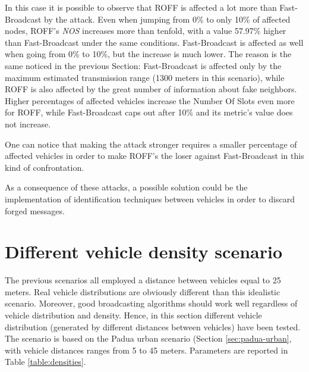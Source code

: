 			In this case it is possible to observe that ROFF is affected a lot more than Fast-Broadcast by the attack. Even when jumping from 0\% to only 10\% of affected nodes, ROFF's \textit{NOS} increases more than tenfold, with a value 57.97\% higher than Fast-Broadcast under the same conditions. Fast-Broadcast is affected as well when going from 0\% to 10\%, but the increase is much lower. The reason is the same noticed in the previous Section: Fast-Broadcast is affected only by the maximum estimated transmission range (1300 meters in this scenario), while ROFF is also affected by the great number of information about fake neighbors. Higher percentages of affected vehicles increase the Number Of Slots even more for ROFF, while Fast-Broadcast caps out after 10\% and its metric's value does not increase.
			
			
			One can notice that making the attack stronger requires a smaller percentage of affected vehicles in order to make ROFF's the loser against Fast-Broadcast in this kind of confrontation. 
			
			
			As a consequence of these attacks, a possible solution could be the implementation of identification techniques between vehicles in order to discard forged messages.
	
	\section{Different vehicle density scenario}
		The previous scenarios all employed a distance between vehicles equal to 25 meters. Real vehicle distributions are obviously different than this idealistic scenario. Moreover, good broadcasting algorithms should work well regardless of vehicle distribution and density. Hence, in this section different vehicle distribution (generated by different distances between vehicles) have been tested. The scenario is based on the Padua urban scenario (Section \ref{sec:padua-urban}, with vehicle distances ranges from 5 to 45 meters. Parameters are reported in Table \ref{table:densities}.
		
